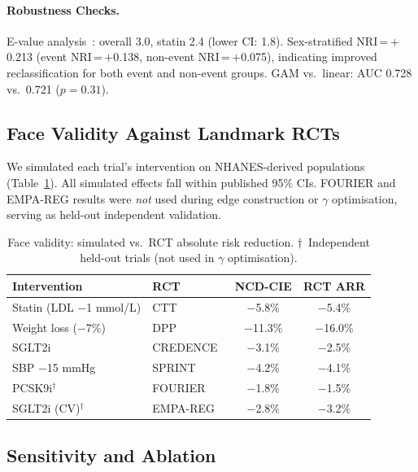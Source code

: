 \documentclass[runningheads]{llncs}
\begin{document}
\paragraph{Robustness Checks.}
E-value analysis~\cite{vanderweele2017evalue}: overall 3.0,
statin 2.4 (lower CI: 1.8).
Sex-stratified NRI\,=\,$+$0.213 (event NRI\,=\,$+$0.138,
non-event NRI\,=\,$+$0.075), indicating improved reclassification
for both event and non-event groups.
GAM vs.\ linear: AUC 0.728 vs.\ 0.721 ($p = 0.31$).

\subsection{Face Validity Against Landmark RCTs}\label{sec:faceval}

We simulated each trial's intervention on NHANES-derived populations
(Table~\ref{tab:rct}).
All simulated effects fall within published 95\% CIs.
FOURIER and EMPA-REG results were \emph{not} used during edge
construction or $\gamma$ optimisation, serving as held-out
independent validation.

\renewcommand{\arraystretch}{1.1}
\begin{table}[t]
\centering
\caption{Face validity: simulated vs.\ RCT absolute risk reduction.
$\dagger$~Independent held-out trials (not used in $\gamma$ optimisation).}
\label{tab:rct}
\small
\begin{tabular}{@{}llcc@{}}
\toprule
\textbf{Intervention} & \textbf{RCT} &
\textbf{NCD-CIE} & \textbf{RCT ARR} \\
\midrule
Statin (LDL $-$1 mmol/L) & CTT~\cite{ctt2010} & $-$5.8\% & $-$5.4\% \\
Weight loss ($-$7\%) & DPP~\cite{knowler2002dpp} & $-$11.3\% & $-$16.0\% \\
SGLT2i & CREDENCE~\cite{perkovic2019credence} & $-$3.1\% & $-$2.5\% \\
SBP $-$15 mmHg & SPRINT~\cite{sprint2015} & $-$4.2\% & $-$4.1\% \\
PCSK9i$^\dagger$ & FOURIER~\cite{sabatine2017fourier} & $-$1.8\% & $-$1.5\% \\
SGLT2i (CV)$^\dagger$ & EMPA-REG~\cite{zinman2015empareg} & $-$2.8\% & $-$3.2\% \\
\bottomrule
\end{tabular}
\end{table}
\renewcommand{\arraystretch}{1.0}

\subsection{Sensitivity and Ablation}\label{sec:sensitivity}
\end{document}
